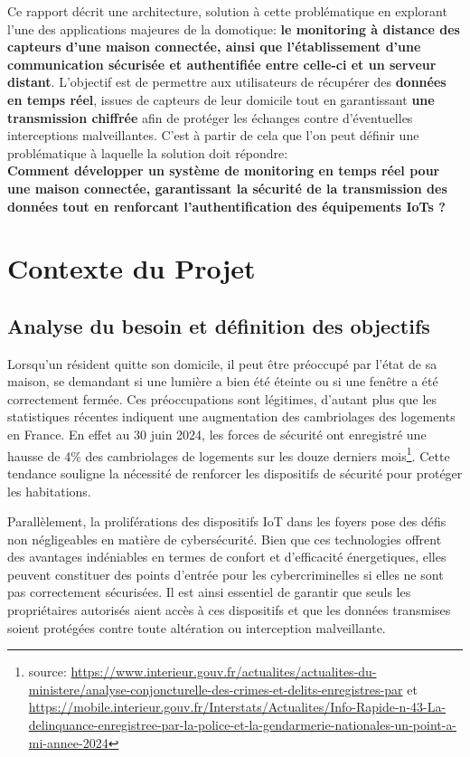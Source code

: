 \documentclass[10pt, a4paper]{report}
\begin{document}
		Ce rapport décrit une architecture, solution à cette problématique en explorant l'une des applications majeures de la domotique: 
		\textbf{le monitoring à distance des capteurs d'une maison connectée, ainsi que l'établissement d'une communication sécurisée et 
		authentifiée entre celle-ci et un serveur distant}. L'objectif est de permettre aux utilisateurs de récupérer des \textbf{données 
		en temps réel}, issues de capteurs de leur domicile tout en garantissant \textbf{une transmission chiffrée} afin de protéger les 
		échanges contre d'éventuelles interceptions malveillantes. C'est à partir de cela que l'on peut définir une problématique à 
		laquelle la solution doit répondre:\\
		
		 \textbf{Comment développer un système de monitoring en temps réel pour une maison connectée, 
		garantissant la sécurité de la transmission des données tout en renforcant l'authentification des équipements IoTs ?}
		
	
	\chapter{Contexte du Projet}
	\section{Analyse du besoin et définition des objectifs}
		Lorsqu'un résident quitte son domicile, il peut être préoccupé par l'état de sa maison, se demandant si une lumière a bien été éteinte ou si une fenêtre a été correctement fermée. Ces préoccupations sont légitimes, d'autant plus que les statistiques récentes indiquent une augmentation des cambriolages des logements en France. En effet au 30 juin 2024, les forces de sécurité ont enregistré une hausse de 4\% des cambriolages de logements sur les douze derniers mois\footnote{source: \url{https://www.interieur.gouv.fr/actualites/actualites-du-ministere/analyse-conjoncturelle-des-crimes-et-delits-enregistres-par} et \url{https://mobile.interieur.gouv.fr/Interstats/Actualites/Info-Rapide-n-43-La-delinquance-enregistree-par-la-police-et-la-gendarmerie-nationales-un-point-a-mi-annee-2024}}. Cette tendance souligne la nécessité de renforcer les dispositifs de sécurité pour protéger les habitations.

		Parallèlement, la proliférations des dispositifs IoT dans les foyers pose des défis non négligeables en matière de cybersécurité. Bien que ces technologies offrent des avantages indéniables en termes de confort et d'efficacité énergetiques, elles peuvent constituer des points d'entrée pour les cybercriminelles si elles ne sont pas correctement sécurisées. Il est ainsi essentiel de garantir que seuls les propriétaires autorisés aient accès à ces dispositifs et que les données transmises soient protégées contre toute altération ou interception malveillante.
		
\end{document}
